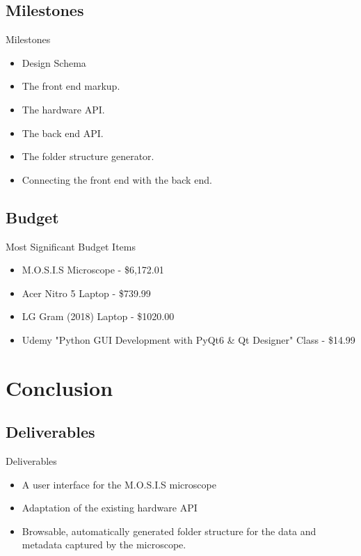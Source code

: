 \documentclass[14pt, aspectratio=169]{beamer}
\begin{document}
\subsection{Milestones}
\begin{frame}{Milestones}
	\begin{itemize}
		\item Design Schema
		\item The front end markup.
		\item The hardware API.
		\item The back end API.
		\item The folder structure generator.
		\item Connecting the front end with the back end.
	\end{itemize}
\end{frame}
\subsection{Budget}
\begin{frame}{Most Significant Budget Items}
	\begin{itemize}
		\item M.O.S.I.S Microscope - \$6,172.01
		\item Acer Nitro 5 Laptop - \$739.99
		\item LG Gram (2018) Laptop - \$1020.00
		\item Udemy "Python GUI Development with PyQt6 \& Qt Designer" Class - \$14.99
	\end{itemize}
\end{frame}
\section{Conclusion}
\subsection{Deliverables}
\begin{frame}{Deliverables}
	\begin{itemize}
		\item A user interface for the M.O.S.I.S microscope
		\item Adaptation of the existing hardware API
		\item Browsable, automatically generated folder structure for the data and metadata captured by the microscope.
	\end{itemize}
\end{frame}
\end{document}

